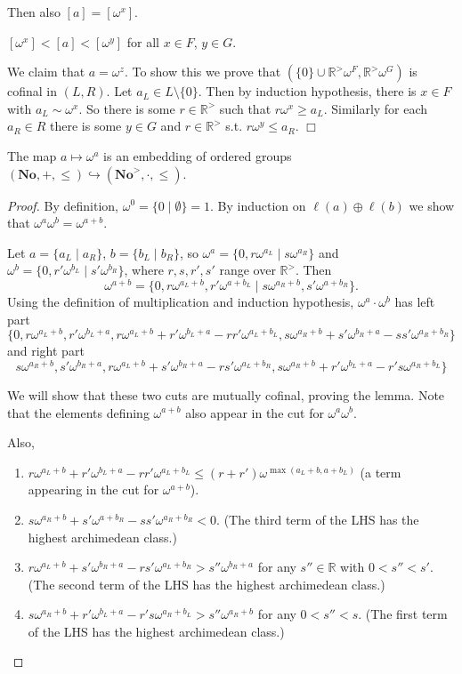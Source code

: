 Then also $[a]=[\omega^x]$.

 $[\omega^x]<[a]<[\omega^y]$ for all $x\in F$, $y\in G$.

We claim that $a=\omega^z$. To show this we prove that $(\{0\}\cup \mathbb{R}^> \omega^F, \mathbb{R}^>\omega^G)$ is cofinal in $(L,R)$. Let $a_L \in L\setminus \{0\}$. Then by induction hypothesis, there is $x\in F$ with $a_L\sim \omega^x$. So there is some $r\in \mathbb{R}^>$ such that $r\omega^x\ge a_L$. Similarly for each $a_R\in R$ there is some $y\in G$ and $r\in \mathbb{R}^>$ s.t. $r\omega^y\le a_R$. $\Box$

\begin{lemma} %
The map $a\mapsto \omega^a$ is an embedding of ordered groups $(\mathbf{No},+,\le)\hookrightarrow (\mathbf{No}^>,\cdot,\le)$.
 \end{lemma} 

\begin{proof} %

By definition, $\omega^0=\{0\mid \emptyset\}=1$. By induction on $\ell(a)\oplus \ell(b)$ we show that $\omega^a\omega^b=\omega^{a+b}$.

Let $a=\{a_L\mid a_R\}$, $b=\{b_L\mid b_R\}$, so $\omega^a=\{0,r\omega^{a_L}\mid s\omega^{a_R}\}$ and $\omega^b=\{0,r'\omega^{b_L}\mid s'\omega^{b_R}\}$, where $r,s,r',s'$ range over $\mathbb{R}^>$. Then 
$$\omega^{a+b}=\{0,r\omega^{a_L+b},r'\omega^{a+b_L}\mid s\omega^{a_R+b}, s'\omega^{a+b_R}\}.$$
Using the definition of multiplication and induction hypothesis,
$\omega^a\cdot\omega^b$ has left part
$$\{0,r\omega^{a_L+b}, r'\omega^{b_L+a},r\omega^{a_L+b}+r'\omega^{b_L+a}-rr'\omega^{a_L+b_L},s\omega^{a_R+b}+s'\omega^{b_R+a}-ss'\omega^{a_R+b_R}\}$$
and right part
$$s\omega^{a_R+b},s'\omega^{b_R+a},r\omega^{a_L+b}+s'\omega^{b_R+a}-rs'\omega^{a_L+b_R},s\omega^{a_R+b}+r'\omega^{b_L+a}-r's\omega^{a_R+b_L}\}$$

We will show that these two cuts are mutually cofinal, proving the lemma. Note that the elements defining $\omega^{a+b}$ also appear in the cut for $\omega^a\omega^b$.

Also, 
\begin{enumerate}
  \item  $r\omega^{a_L+b}+r'\omega^{b_L+a}-rr'\omega^{a_L+b_L}\le (r+r')\omega^{\max(a_L+b,a+b_L)}$ (a term appearing in the cut for $\omega^{a+b}$).
  \item  $s\omega^{a_R+b}+s'\omega^{a+b_R}-ss'\omega^{a_R+b_R}<0$. (The third term  of the LHS has the highest archimedean class.)
  \item  $r\omega^{a_L+b}+s'\omega^{b_R+a}-rs'\omega^{a_L+b_R}>s''\omega^{b_R+a}$ for any $s''\in\mathbb{R}$ with $0<s''<s'$. (The second term of the LHS has the highest archimedean class.)
  \item  $s\omega^{a_R+b}+r'\omega^{b_L+a}-r's\omega^{a_R+b_L}>s''\omega^{a_R+b}$ for any $0<s''<s$. (The first term of the LHS has the highest archimedean class.)
\end{enumerate} 
\end{proof} 

